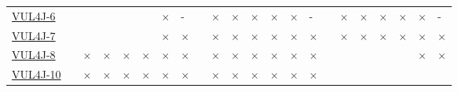 \begin{table}[!htbp]
{\begin{tabular}{|l|lll|ll|ll||lll|ll|ll||lll|ll|ll|}
		\href{https://github.com/apache/commons-compress/commit/2a2f1dc48e22a34ddb72321a4db211da91aa933b}{VUL4J-6} & \cellcolor{green}\checkmark & \cellcolor{yellow}\halfcheckmark & \cellcolor{green}\checkmark & 
		\cellcolor{yellow}\halfcheckmark & \cellcolor{green}\checkmark & \cellcolor{red}$\times$ & \cellcolor{lightgray}-  & \cellcolor{green}\checkmark & \cellcolor{red}$\times$ & \cellcolor{red}$\times$ & \cellcolor{red}$\times$ & \cellcolor{red}$\times$ & \cellcolor{red}$\times$ & \cellcolor{lightgray}-     & \cellcolor{green}\checkmark & \cellcolor{red}$\times$ & \cellcolor{red}$\times$ & \cellcolor{red}$\times$ & \cellcolor{red}$\times$ & \cellcolor{red}$\times$ & \cellcolor{lightgray}-\\ 
		\href{https://github.com/apache/commons-compress/commit/a41ce6892cb0590b2e658704434ac0dbcb6834c8}{VUL4J-7} & \cellcolor{green}\checkmark & \cellcolor{yellow}\halfcheckmark & \cellcolor{green}\checkmark & 
		\cellcolor{yellow}\halfcheckmark & \cellcolor{green}\checkmark & \cellcolor{red}$\times$ & \cellcolor{red}$\times$  & \cellcolor{green}\checkmark & \cellcolor{red}$\times$ & \cellcolor{red}$\times$ & \cellcolor{red}$\times$ & \cellcolor{red}$\times$ & \cellcolor{red}$\times$ & \cellcolor{red}$\times$     & \cellcolor{green}\checkmark & \cellcolor{red}$\times$ & \cellcolor{red}$\times$ & \cellcolor{red}$\times$ & \cellcolor{red}$\times$ & \cellcolor{red}$\times$ & \cellcolor{red}$\times$\\ 
		\href{https://github.com/apache/commons-compress/commit/4ad5d80a6272e007f64a6ac66829ca189a8093b9}{VUL4J-8} & \cellcolor{green}\checkmark & \cellcolor{red}$\times$ & \cellcolor{red}$\times$ & \cellcolor{red}$\times$ & \cellcolor{red}$\times$ & \cellcolor{red}$\times$ & \cellcolor{red}$\times$  & \cellcolor{green}\checkmark & \cellcolor{red}$\times$ & \cellcolor{red}$\times$ & \cellcolor{red}$\times$ & \cellcolor{red}$\times$ & \cellcolor{red}$\times$ & \cellcolor{red}$\times$     & \cellcolor{green}\checkmark & 
		\cellcolor{yellow}\halfcheckmark & \cellcolor{green}\checkmark & 
		\cellcolor{yellow}\halfcheckmark & \cellcolor{green}\checkmark & \cellcolor{red}$\times$ & \cellcolor{red}$\times$\\ 
		\href{https://github.com/apache/commons-fileupload/commit/163a6061fbc077d4b6e4787d26857c2baba495d1}{VUL4J-10} & \cellcolor{green}\checkmark & \cellcolor{red}$\times$ & \cellcolor{red}$\times$ & \cellcolor{red}$\times$ & \cellcolor{red}$\times$ & \cellcolor{red}$\times$ & \cellcolor{red}$\times$  & \cellcolor{green}\checkmark & \cellcolor{red}$\times$ & \cellcolor{red}$\times$ & \cellcolor{red}$\times$ & \cellcolor{red}$\times$ & \cellcolor{red}$\times$ & \cellcolor{red}$\times$     & \cellcolor{green}\checkmark & 

\end{tabular}}
\end{table}
